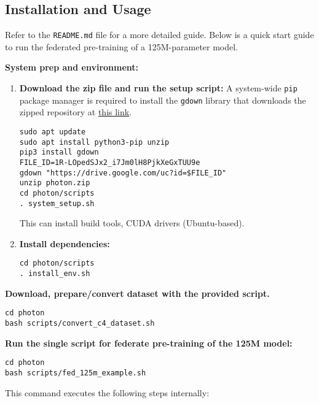\documentclass{sigplanconf}
\begin{document}
\subsection{Installation and Usage}

Refer to the \texttt{README.md} file for a more detailed guide. Below is a quick start guide to run the federated pre-training of a 125M-parameter model.

\noindent
\textbf{System prep and environment:}
\begin{enumerate}
  \item \textbf{Download the zip file and run the setup script:} A system-wide \texttt{pip} package manager is required to install the \texttt{gdown} library that downloads the zipped repository at \href{https://drive.google.com/file/d/1R-LOpedSJx2_i7Jm0lH8PjkXeGxTUU9e/view?usp=drive_link}{this link}.
  \begin{verbatim}
sudo apt update
sudo apt install python3-pip unzip
pip3 install gdown
FILE_ID=1R-LOpedSJx2_i7Jm0lH8PjkXeGxTUU9e
gdown "https://drive.google.com/uc?id=$FILE_ID"
unzip photon.zip
cd photon/scripts
. system_setup.sh
  \end{verbatim}
  This can install build tools, CUDA drivers (Ubuntu-based).
  \item \textbf{Install dependencies:}
  \begin{verbatim}
cd photon/scripts
. install_env.sh
  \end{verbatim}
\end{enumerate}
\textbf{Download, prepare/convert dataset with the provided script.}
\begin{verbatim}
cd photon
bash scripts/convert_c4_dataset.sh
\end{verbatim}
\noindent
\textbf{Run the single script for federate pre-training of the 125M model:}
\begin{verbatim}
cd photon
bash scripts/fed_125m_example.sh
\end{verbatim}
This command executes the following steps internally:
\end{document}

